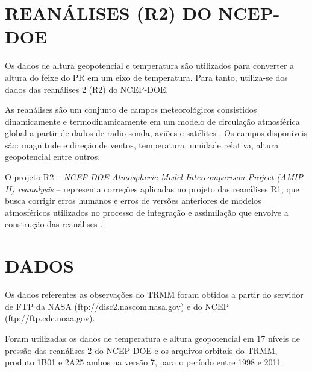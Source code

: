 \section{REANÁLISES (R2) DO NCEP-DOE}

Os dados de altura geopotencial e temperatura são utilizados para converter a altura do feixe do PR em um eixo de temperatura. Para tanto, utiliza-se dos dados das reanálises 2 (R2) do NCEP-DOE.   

As reanálises são um conjunto de campos meteorológicos  consistidos dinamicamente e termodinamicamente em um modelo de circulação atmosférica global a partir de dados de radio-sonda, aviões e satélites \cite{kalnay1996ncep}. Os campos disponíveis são: magnitude e direção de ventos, temperatura, umidade relativa, altura geopotencial entre outros.

O projeto R2  -- \textit{NCEP-DOE Atmospheric Model Intercomparison Project (AMIP-II) reanalysis} -- representa correções aplicadas no projeto das reanálises R1, que busca corrigir erros humanos e erros de versões anteriores de modelos atmosféricos utilizados no processo de integração e assimilação que envolve a construção das reanálises \cite{kanamitsu}.



\section{DADOS}

Os dados referentes as observações do TRMM foram obtidos a partir do servidor de FTP da NASA (ftp://disc2.nascom.nasa.gov) e do NCEP (ftp://ftp.cdc.noaa.gov).

Foram utilizadas os dados de temperatura e altura geopotencial em 17 níveis de pressão das reanálises 2 do NCEP-DOE e os arquivos orbitais do TRMM, produto 1B01 e 2A25 ambos na versão 7, para o período entre 1998 e 2011. 



